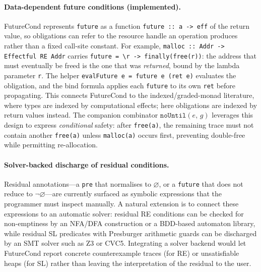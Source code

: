 \documentclass[acmsmall,screen]{acmart}
\newcommand{\noUntil}[2]{\mathtt{noUntil}(#1,\,#2)}
\newcommand{\univ}{\neg\varnothing}
\begin{document}
\paragraph{Data-dependent future conditions (implemented).}
FutureCond represents \lstinline{future} as a function
\lstinline{future :: a -> eff} of the return value, so obligations can
refer to the resource handle an operation produces rather than a
fixed call-site constant.
For example, \lstinline{malloc :: Addr -> Effectful RE Addr} carries
\lstinline{future = \r -> finally(free(r))}: the address that must
eventually be freed is the one that was \emph{returned}, bound by the
lambda parameter \lstinline{r}.
The helper \lstinline{evalFuture e = future e (ret e)} evaluates the
obligation, and the bind formula applies each \lstinline{future} to
its own \lstinline{ret} before propagating.
This connects FutureCond to the indexed/graded-monad literature, where
types are indexed by computational effects; here obligations are
indexed by return values instead.
The companion combinator $\noUntil{e}{g}$ leverages this design to
express \emph{conditional} safety: after \lstinline{free(a)}, the
remaining trace must not contain another \lstinline{free(a)} unless
\lstinline{malloc(a)} occurs first, preventing double-free while
permitting re-allocation.

\paragraph{Solver-backed discharge of residual conditions.}
Residual annotations---a \lstinline{pre} that normalises to $\varnothing$,
or a \lstinline{future} that does not reduce to $\univ$---are currently
surfaced as symbolic expressions that the programmer must inspect manually.
A natural extension is to connect these expressions to an automatic solver:
residual RE conditions can be checked for non-emptiness by an NFA/DFA
construction or a BDD-based automaton library, while residual SL predicates
with Presburger arithmetic guards can be discharged by an SMT solver such as
Z3 or CVC5.
Integrating a solver backend would let FutureCond report concrete
counterexample traces (for RE) or unsatisfiable heaps (for SL) rather than
leaving the interpretation of the residual to the user.
\end{document}
